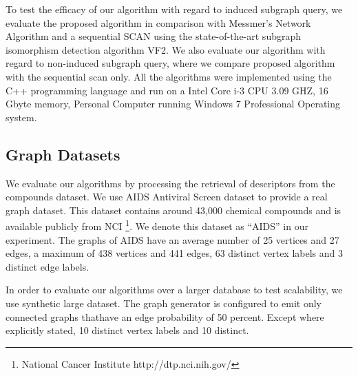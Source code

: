 To test the efficacy of our algorithm with regard to induced subgraph query, we evaluate the proposed algorithm in comparison with Messmer's Network Algorithm and a sequential SCAN using the state-of-the-art subgraph isomorphism detection algorithm VF2\cite{cordella2001_vf2}.
We also evaluate our algorithm with regard to non-induced subgraph query, where we compare proposed algorithm with the sequential scan only.
All the algorithms were implemented using the C++ programming language and run on a Intel Core i-3 CPU 3.09 GHZ, 16 Gbyte memory, Personal Computer running Windows 7 Professional Operating system.

\subsection{Graph Datasets}
We evaluate our algorithms by processing the retrieval of descriptors from the compounds dataset.
We use AIDS Antiviral Screen dataset to provide a real graph dataset.
This dataset contains around 43,000 chemical compounds and is available publicly from NCI
\footnote{National Cancer Institute http://dtp.nci.nih.gov/}.
We denote this dataset as ``AIDS'' in our experiment.
The graphs of AIDS have an average number of 25 vertices and 27 edges, a maximum of 438 vertices and 441 edges,
63 distinct vertex labels and 3 distinct edge labels.

In order to evaluate our algorithms over a larger database to test scalability, we use synthetic large dataset. 
The graph generator is configured to emit only connected graphs thathave an edge probability of 50 percent. 
Except where explicitly stated, 10 distinct vertex labels and 10 distinct.

